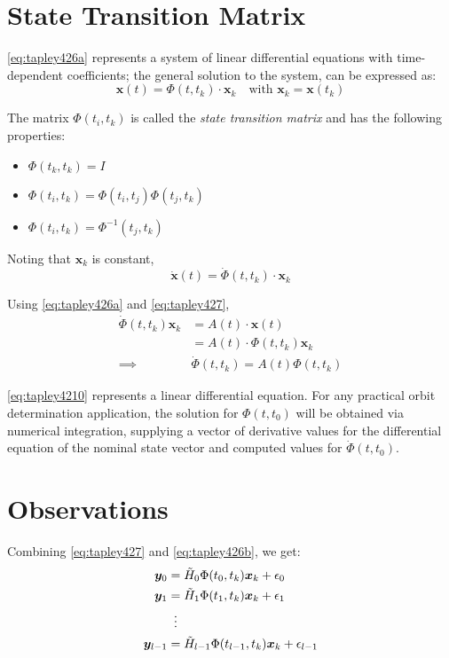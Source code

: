 \section{State Transition Matrix}
\ref{eq:tapley426a} represents a system of linear differential equations with time-dependent 
coefficients; the general solution to the system, can be expressed as:
\begin{equation}
\label{eq:tapley427}
  \bm{x}(t) = \Phi (t, t_k) \cdot \bm{x}_k \quad \text{with } \bm{x}_k = \bm{x}(t_k)
\end{equation}

The matrix \(\Phi (t_i, t_k) \) is called the \emph{state transition matrix} and has the 
following properties:
\begin{itemize}
  \item \(\Phi (t_k, t_k) = I \)
  \item \(\Phi (t_i, t_k) = \Phi (t_i, t_j) \Phi (t_j, t_k) \)
  \item \(\Phi (t_i, t_k) = {\Phi}^{-1} (t_j, t_k) \)
\end{itemize}

Noting that \(\bm{x}_k\) is constant,
\begin{equation}
  \label{eq:tapley429}
  \bm{\dot{x}}(t) = \dot{\Phi} (t, t_k) \cdot \bm{x}_k
\end{equation}

Using \ref{eq:tapley426a} and \ref{eq:tapley427},
\begin{equation}
  \label{eq:tapley4210}
  \begin{aligned}
  \dot{\Phi} (t, t_k) \bm{x}_k & = A(t) \cdot \bm{x} (t) \\
  & = A(t) \cdot \Phi (t, t_k) \bm{x}_k \\ 
  \implies & \dot{\Phi} (t, t_k) = A(t) \Phi (t, t_k)
  \end{aligned}
\end{equation}

\ref{eq:tapley4210} represents a linear differential equation. For any practical orbit 
determination application, the solution for \(\Phi (t, t_0)\)  will be obtained
via numerical integration, supplying a vector of derivative values for the differential 
equation of the nominal state vector and computed values for \(\dot{\Phi} (t, t_0)\).

\section{Observations}
Combining \ref{eq:tapley427} and \ref{eq:tapley426b}, we get:
\begin{equation}
  \label{eq:tapley4237}
  \begin{aligned}
    \bm{y}_0 &= \tilde{H}_0 \Phi (t_0, t_k) \bm{x}_k + {\epsilon}_0 \\
    \bm{y}_1 &= \tilde{H}_1 \Phi (t_1, t_k) \bm{x}_k + {\epsilon}_1 \\
    & \vdotswithin{=} \\
    \bm{y}_{l-1} &= \tilde{H}_{l-1} \Phi (t_{l-1}, t_k) \bm{x}_k + {\epsilon}_{l-1}
  \end{aligned}
\end{equation}

